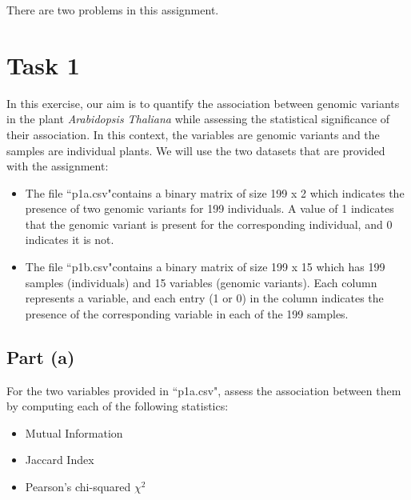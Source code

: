 \documentclass[11pt]{article}
\begin{document}

\newcommand{\filenameA}{``p1a.csv"}
\newcommand{\filenameB}{``p1b.csv"}
\newcommand{\filenameC}{``p2a.csv"}
\newcommand{\filenameD}{``p2b.csv"}
\newcommand{\filenameE}{``p2c.csv"}



There are two problems in this assignment.

\section{Task 1}
In this exercise, our aim is to quantify the association between genomic variants in the plant {\em Arabidopsis Thaliana} while assessing the statistical significance of their association.
In this context, the variables are genomic variants and the samples are individual plants.  
We will use the two datasets that are provided with the assignment:

\begin{itemize}
\item The file \filenameA contains a binary matrix of size 199 x 2 which indicates the presence of two genomic variants for 199 individuals. A value of 1 indicates that the genomic variant is present for the corresponding individual, and 0 indicates it is not.
\item The file \filenameB contains a binary matrix of size 199 x 15 which has 199 samples (individuals) and 15 variables (genomic variants). Each column represents a variable, and each entry (1 or 0)  in the column indicates the presence of the corresponding variable in each of the 199 samples. 
\end{itemize}
\subsection{Part (a)}

For the two variables provided in \filenameA, assess the association between them by computing each of the following statistics:
\begin{itemize}
	\itemsep -0.3em 
	\item Mutual Information
	\item Jaccard Index
	\item Pearson's chi-squared $\chi^2$
\end{itemize}
\end{document}
